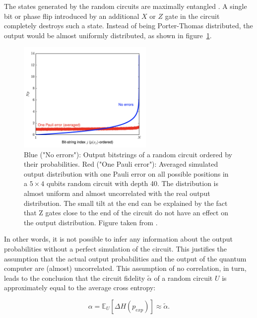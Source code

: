The states generated by the random circuits are
maximally entangled \cite{Boixo2018supremacy}. A single bit or phase flip introduced by an additional $ X $ or $ Z $ gate in the circuit completely destroys such a state. Instead of being Porter-Thomas distributed, the output would be almost uniformly distributed, as shown in figure~\ref{fig:rcs_noise}.

\begin{figure}[H]
  \centering
  \includegraphics[width=0.58\textwidth]{figures/rcs_noise}
  \caption[Effect of One Pauli Error on Random Circuits]{Blue ("No errors"): Output bitstrings of a random circuit ordered by their probabilities. Red ("One Pauli error"): Averaged 
  simulated output distribution with one Pauli error on all possible positions in a $5 \times 4$ qubits random circuit 
  with depth 40. The distribution is almost uniform and almost uncorrelated with the real output distribution. The small tilt at 
  the end can be explained by the fact that Z gates close to the end of the circuit do not have an effect on the output distribution. Figure taken from \cite{Boixo2018supremacy}.}
  \label{fig:rcs_noise}
\end{figure}

In other words, it is not possible to infer any information about the output
probabilities without a perfect simulation of the circuit.
This justifies the assumption that the actual output probabilities and the output
of the quantum computer are (almost) uncorrelated.
This assumption of no correlation, in turn, leads to the conclusion that the
circuit fidelity $\tilde{\alpha}$ of a random
circuit $U$ is approximately equal to the average cross entropy:

\begin{equation}
  \label{eq:extrapolate}
  \alpha = \mathbb{E}_U[\Delta H(p_{exp})] \approx \tilde{\alpha}.
\end{equation}

